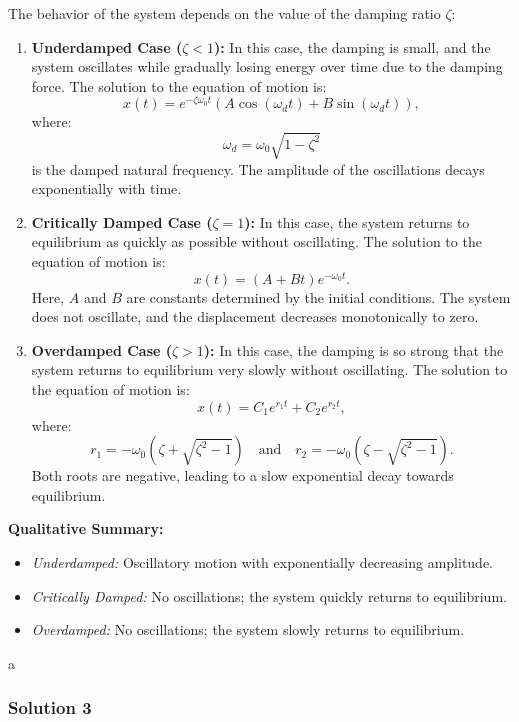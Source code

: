\documentclass{article}
\begin{document}
The behavior of the system depends on the value of the damping ratio \( \zeta \):
\begin{enumerate}
    \item \textbf{Underdamped Case (\( \zeta < 1 \)):}  
    In this case, the damping is small, and the system oscillates while gradually losing energy over time due to the damping force. The solution to the equation of motion is:
    \[
    x(t) = e^{-\zeta \omega_0 t} \left( A \cos(\omega_d t) + B \sin(\omega_d t) \right),
    \]
    where:
    \[
    \omega_d = \omega_0 \sqrt{1 - \zeta^2}
    \]
    is the damped natural frequency. The amplitude of the oscillations decays exponentially with time.

    \item \textbf{Critically Damped Case (\( \zeta = 1 \)):}  
    In this case, the system returns to equilibrium as quickly as possible without oscillating. The solution to the equation of motion is:
    \[
    x(t) = (A + Bt)e^{-\omega_0 t}.
    \]
    Here, \( A \) and \( B \) are constants determined by the initial conditions. The system does not oscillate, and the displacement decreases monotonically to zero.

    \item \textbf{Overdamped Case (\( \zeta > 1 \)):}  
    In this case, the damping is so strong that the system returns to equilibrium very slowly without oscillating. The solution to the equation of motion is:
    \[
    x(t) = C_1 e^{r_1 t} + C_2 e^{r_2 t},
    \]
    where:
    \[
    r_1 = -\omega_0 (\zeta + \sqrt{\zeta^2 - 1}) \quad \text{and} \quad r_2 = -\omega_0 (\zeta - \sqrt{\zeta^2 - 1}).
    \]
    Both roots are negative, leading to a slow exponential decay towards equilibrium.

\end{enumerate}

\textbf{Qualitative Summary:}
\begin{itemize}
    \item \textit{Underdamped:} Oscillatory motion with exponentially decreasing amplitude.
    \item \textit{Critically Damped:} No oscillations; the system quickly returns to equilibrium.
    \item \textit{Overdamped:} No oscillations; the system slowly returns to equilibrium.
\end{itemize}

a\subsubsection{Solution 3}
\end{document}
